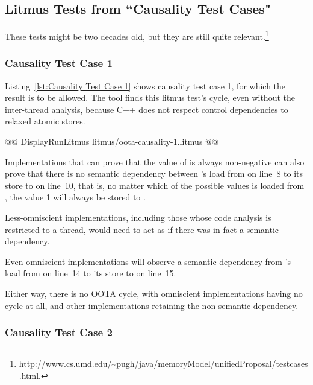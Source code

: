 \documentclass[10]{article}
\begin{document}
\subsection{Litmus Tests from “Causality Test Cases"}
\label{app:Litmus Tests from “Causality Test Cases"}

These tests might be two decades old, but they are still quite
relevant.\footnote{
	\url{http://www.cs.umd.edu/~pugh/java/memoryModel/unifiedProposal/testcases.html}.}

\subsubsection{Causality Test Case 1}
\label{app:Causality Test Case 1}

Listing~\ref{lst:Causality Test Case 1}
shows causality test case 1, for which the  result
is to be allowed.
The  tool finds this litmus test's cycle, even without the
inter-thread analysis, because C++ does not respect control dependencies
to relaxed atomic stores.

\begin{listing}[tbp]
@@ DisplayRunLitmus litmus/oota-causality-1.litmus @@
\caption{Causality Test Case 1}
\label{lst:Causality Test Case 1}
\end{listing}

Implementations that can prove that the value of  is always
non-negative can also prove that there is no semantic dependency between
's load from  on line~8 to its store to  on line~10,
that is, no matter which of the possible values is loaded from ,
the value 1 will always be stored to .

Less-omniscient implementations, including those whose code analysis
is restricted to a thread, would need to act as if there was in fact a
semantic dependency.

Even omniscient implementations will observe a semantic dependency from
's load from  on line~14 to its store to  on line~15.

Either way, there is no OOTA cycle, with omniscient implementations
having no cycle at all, and other implementations retaining the
non-semantic dependency.

\subsubsection{Causality Test Case 2}
\label{app:Causality Test Case 2}
\end{document}
